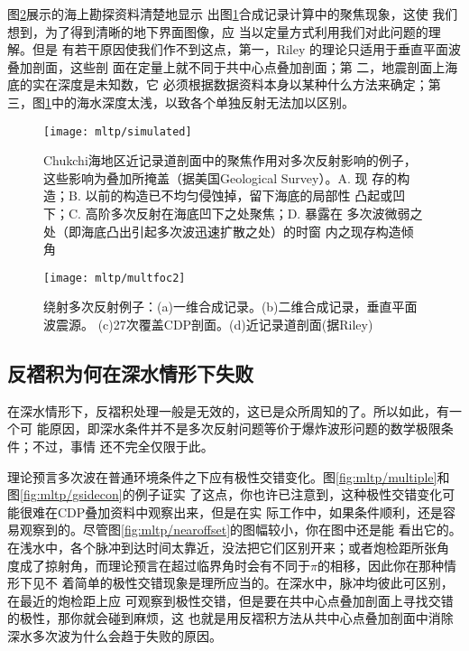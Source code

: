 图\ref{fig:mltp/multfoc2}展示的海上勘探资料清楚地显示
出图\ref{fig:mltp/simulated}合成记录计算中的聚焦现象，这使
我们想到，为了得到清晰的地下界面图像，应
当以定量方式利用我们对此问题的理解。但是
有若干原因使我们作不到这点，第一，Riley
的理论只适用于垂直平面波叠加剖面，这些剖
面在定量上就不同于共中心点叠加剖面；第
二，地震剖面上海底的实在深度是未知数，它
必须根据数据资料本身以某种什么方法来确定；第三，图\ref{fig:mltp/simulated}中的海水深度太浅，以致各个单独反射无法加以区别。

\begin{figure}[H]
\centering
\texttt{[image: mltp/simulated]}
\caption[simulated]{
Chukchi海地区近记录道剖面中的聚焦作用对多次反射影响的例子，
这些影响为叠加所掩盖（据美国Geological Survey）。A. 现
存的构造；B. 以前的构造已不均匀侵蚀掉，留下海底的局部性
凸起或凹下；C. 高阶多次反射在海底凹下之处聚焦；D. 暴露在
多次波微弱之处（即海底凸出引起多次波迅速扩散之处）的时窗
内之现存构造倾角
}
\label{fig:mltp/simulated}
\end{figure}

\begin{figure}[H]
\centering
\texttt{[image: mltp/multfoc2]}
\caption[multfoc2]{
绕射多次反射例子：(a)一维合成记录。(b)二维合成记录，垂直平面波震源。
(c)27次覆盖CDP剖面。(d)近记录道剖面(据Riley)
}
\label{fig:mltp/multfoc2}
\end{figure}

\subsection{反褶积为何在深水情形下失败}
\label{sec:5.5.8}

在深水情形下，反褶积处理一般是无效的，这已是众所周知的了。所以如此，有一个可
能原因，即深水条件并不是多次反射问题等价于爆炸波形问题的数学极限条件；不过，事情
还不完全仅限于此。

理论预言多次波在普通环境条件之下应有极性交错变化。图\ref{fig:mltp/multiple}和图\ref{fig:mltp/gsidecon}的例子证实
了这点，你也许已注意到，这种极性交错变化可能很难在CDP叠加资料中观察出来，但是在实
际工作中，如果条件顺利，还是容易观察到的。尽管图\ref{fig:mltp/nearoffset}的图幅较小，你在图中还是能
看出它的。在浅水中，各个脉冲到达时间太靠近，没法把它们区别开来；或者炮检距所张角
度成了掠射角，而理论预言在超过临界角时会有不同于$\pi$的相移，因此你在那种情形下见不
着简单的极性交错现象是理所应当的。在深水中，脉冲均彼此可区别，在最近的炮检距上应
可观察到极性交错，但是要在共中心点叠加剖面上寻找交错的极性，那你就会碰到麻烦，这
也就是用反褶积方法从共中心点叠加剖面中消除深水多次波为什么会趋于失败的原因。

